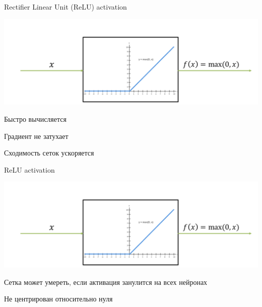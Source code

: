 \documentclass[notes,12pt, aspectratio=169]{beamer}
\begin{document}
\begin{frame}{Rectifier Linear Unit (ReLU) activation}
\begin{center}
\includegraphics[width=.8\linewidth]{relu_activation.png}
\end{center}

\begin{itemize}
{ \color{green} 
\item  Быстро вычисляется 

\item  Градиент не затухает

\item  Сходимость сеток ускоряется 
} 
\end{itemize}
\end{frame}


\begin{frame}{ReLU activation}
\begin{center}
\includegraphics[width=.8\linewidth]{relu_activation.png}
\end{center}

\begin{itemize}
{ \color{red} 
\item  Сетка может умереть, если активация занулится на всех нейронах

\item  Не центрирован относительно нуля
} 
\end{itemize}
\end{frame}
\end{document}
